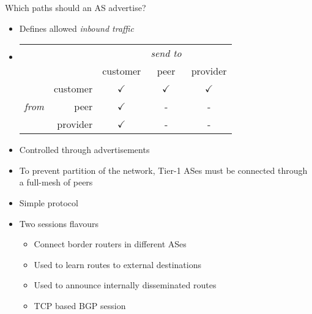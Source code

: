 \begin{itemize}
\begin{itemize}
\begin{itemize}
\begin{itemize}
\begin{itemize}
                                \end{itemize}
                             Which paths should an AS advertise?
                                \begin{itemize}
                                    \item Defines allowed \textit{inbound traffic}
                                    \item
\begin{tabular}{| c r | c c c |}
    &&& \textit{send to} &\\
    &&customer & peer & provider\\\hline
    & customer & $\checkmark$ & $\checkmark$ & $\checkmark$\\
    \textit{from} & peer & $\checkmark$ & - & -\\
         &provider & $\checkmark$ & - & -\\
\end{tabular}
                                    \item Controlled through advertisements
                                    \item To prevent partition of the network, Tier-1 ASes must be connected through a full-mesh of peers
                                \end{itemize}
                        \end{itemize}
                \end{itemize}
                \begin{itemize}
                    \item Simple protocol
                    \item Two sessions flavours
                        \begin{itemize}
                                \begin{itemize}
                                    \item Connect border routers in different ASes
                                    \item Used to learn routes to external destinations
                                    \item Used to announce internally disseminated routes
                                    \item TCP based BGP session
                                \end{itemize}

\end{itemize}
\end{itemize}
\end{itemize}
\end{itemize}
